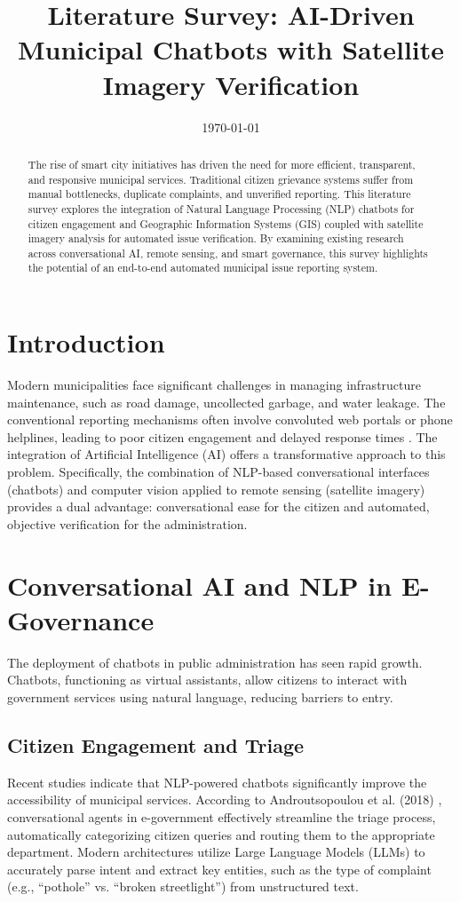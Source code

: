 \documentclass[12pt,a4paper]{article}
\title{\textbf{Literature Survey: AI-Driven Municipal Chatbots with Satellite Imagery Verification}}
\author{}
\date{\today}
\begin{document}
\maketitle

\begin{abstract}
The rise of smart city initiatives has driven the need for more efficient, transparent, and responsive municipal services. Traditional citizen grievance systems suffer from manual bottlenecks, duplicate complaints, and unverified reporting. This literature survey explores the integration of Natural Language Processing (NLP) chatbots for citizen engagement and Geographic Information Systems (GIS) coupled with satellite imagery analysis for automated issue verification. By examining existing research across conversational AI, remote sensing, and smart governance, this survey highlights the potential of an end-to-end automated municipal issue reporting system.
\end{abstract}

\section{Introduction}
Modern municipalities face significant challenges in managing infrastructure maintenance, such as road damage, uncollected garbage, and water leakage. The conventional reporting mechanisms often involve convoluted web portals or phone helplines, leading to poor citizen engagement and delayed response times \cite{smartcities2019}. The integration of Artificial Intelligence (AI) offers a transformative approach to this problem. Specifically, the combination of NLP-based conversational interfaces (chatbots) and computer vision applied to remote sensing (satellite imagery) provides a dual advantage: conversational ease for the citizen and automated, objective verification for the administration.

\section{Conversational AI and NLP in E-Governance}
The deployment of chatbots in public administration has seen rapid growth. Chatbots, functioning as virtual assistants, allow citizens to interact with government services using natural language, reducing barriers to entry. 

\subsection{Citizen Engagement and Triage}
Recent studies indicate that NLP-powered chatbots significantly improve the accessibility of municipal services. According to Androutsopoulou et al. (2018) \cite{androutsopoulou2018}, conversational agents in e-government effectively streamline the triage process, automatically categorizing citizen queries and routing them to the appropriate department. Modern architectures utilize Large Language Models (LLMs) to accurately parse intent and extract key entities, such as the type of complaint (e.g., ``pothole'' vs. ``broken streetlight'') from unstructured text.
\end{document}
